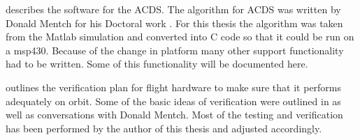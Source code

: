  describes the software for the \ac{ACDS}. The algorithm for \ac{ACDS} was written by Donald Mentch for his Doctoral work \cite{Mentch11}. For this thesis the algorithm was taken from the Matlab simulation and converted into C code so that it could be run on a msp430. Because of the change in platform many other support functionality had to be written. Some of this functionality will be documented here.

 outlines the verification plan for flight hardware to make sure that it performs adequately on orbit. Some of the basic ideas of verification were outlined in \cite{Mentch11} as well as conversations with Donald Mentch. Most of the testing and verification has been performed by the author of this thesis and adjusted accordingly.

